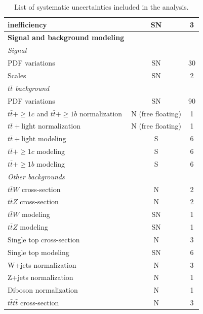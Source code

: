 \begin{table}[hp]
\begin{tabular*}{150mm}{@{\extracolsep{\fill}}lcc}
    \multicolumn{1}{l}{inefficiency}                                 & SN &  3\\
    \hline
    \textbf{Signal and background modeling} & &\\
    \hline
    \textit{Signal} & &\\
    \multicolumn{1}{l}{PDF variations} & SN & 30\\
    \multicolumn{1}{l}{Scales}         & SN &  2\\
    \hline
    \textit{$t\bar{t}$ background} & &\\
    \multicolumn{1}{l}{PDF variations}                                        & SN                & 90\\
    \multicolumn{1}{l}{$t\bar{t}+\geq1c$ and $t\bar{t}+\geq1b$ normalization} & N (free floating) & 1\\
    \multicolumn{1}{l}{$t\bar{t}+\text{light}$ normalization}                 & N (free floating) & 1\\
    \multicolumn{1}{l}{$t\bar{t}+\text{light}$ modeling}                     & S                 & 6\\
    \multicolumn{1}{l}{$t\bar{t}+\geq1c$ modeling}                           & S                 & 6\\
    \multicolumn{1}{l}{$t\bar{t}+\geq1b$ modeling}                           & S                 & 6\\
    \hline
    \textit{Other backgrounds} & &\\
    \multicolumn{1}{l}{$t\bar{t}W$ cross-section}        & N  & 2\\
    \multicolumn{1}{l}{$t\bar{t}Z$ cross-section}        & N  & 2\\
    \multicolumn{1}{l}{$t\bar{t}W$ modeling}            & SN & 1\\
    \multicolumn{1}{l}{$t\bar{t}Z$ modeling}            & SN & 1\\
    \multicolumn{1}{l}{Single top cross-section}         & N  & 3\\
    \multicolumn{1}{l}{Single top modeling}             & SN & 6\\
    \multicolumn{1}{l}{W+jets normalization}             & N  & 3\\
    \multicolumn{1}{l}{Z+jets normalization}             & N  & 1\\
    \multicolumn{1}{l}{Diboson normalization}            & N  & 1\\
    \multicolumn{1}{l}{$t\bar{t}t\bar{t}$ cross-section} & N  & 3\\
    \hline\hline
  \end{tabular*}
  \caption{List of systematic uncertainties included in the analysis.}
  \label{tb:SystSources}
\end{table}


